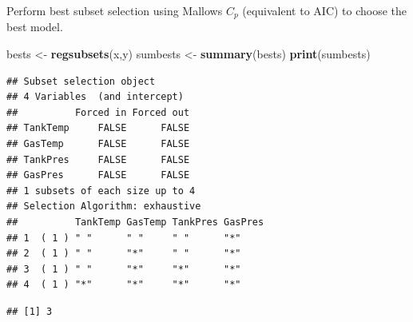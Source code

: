 \documentclass[
  ignorenonframetext,
]{beamer}
\newenvironment{Shaded}{\begin{snugshade}}{\end{snugshade}}
\newcommand{\KeywordTok}[1]{\textcolor[rgb]{0.13,0.29,0.53}{\textbf{#1}}}
\newcommand{\NormalTok}[1]{#1}
\newcommand{\OperatorTok}[1]{\textcolor[rgb]{0.81,0.36,0.00}{\textbf{#1}}}
\newcommand{\StringTok}[1]{\textcolor[rgb]{0.31,0.60,0.02}{#1}}
\begin{document}
\begin{frame}[fragile]

Perform best subset selection using Mallows \(C_p\) (equivalent to AIC)
to choose the best model.

\begin{Shaded}
\begin{Highlighting}[]
\NormalTok{bests <-}\StringTok{ }\KeywordTok{regsubsets}\NormalTok{(x,y)}
\NormalTok{sumbests <-}\StringTok{ }\KeywordTok{summary}\NormalTok{(bests)}
\KeywordTok{print}\NormalTok{(sumbests)}
\end{Highlighting}
\end{Shaded}

\begin{verbatim}
## Subset selection object
## 4 Variables  (and intercept)
##          Forced in Forced out
## TankTemp     FALSE      FALSE
## GasTemp      FALSE      FALSE
## TankPres     FALSE      FALSE
## GasPres      FALSE      FALSE
## 1 subsets of each size up to 4
## Selection Algorithm: exhaustive
##          TankTemp GasTemp TankPres GasPres
## 1  ( 1 ) " "      " "     " "      "*"    
## 2  ( 1 ) " "      "*"     " "      "*"    
## 3  ( 1 ) " "      "*"     "*"      "*"    
## 4  ( 1 ) "*"      "*"     "*"      "*"
\end{verbatim}

\begin{Shaded}
\end{Shaded}

\begin{verbatim}
## [1] 3
\end{verbatim}

\end{frame}
\end{document}
